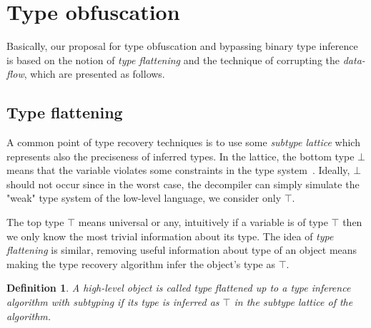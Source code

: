 \documentclass[compsoc,conference,a4paper,10pt,times]{IEEEtran}
\newtheorem{definition}{Definition}
\begin{document}
\section{Type obfuscation}
\noindent
Basically, our proposal for type obfuscation and bypassing binary type inference is based on the notion of
\emph{type flattening} and the technique of corrupting the \emph{data-flow}, which are presented as follows.

\subsection{Type flattening}
\noindent
A common point of type recovery techniques is to use some \emph{subtype lattice}
which represents also the preciseness of inferred types. In the lattice, the bottom type $\bot$ means
that the variable violates some constraints in the type system~\cite{lee_tie_2011}.
Ideally, $\bot$ should not occur since in the worst case, the decompiler can simply
simulate the "weak" type system of the low-level language, we consider only $\top$.

The top type $\top$ means universal or any, intuitively if a variable is of type $\top$ then we only
know the most trivial information about its type.
The idea of \emph{type flattening} is similar, removing useful information about type
of an object means making the type recovery algorithm infer the object's type as $\top$.

\begin{definition}
  A high-level object is called type flattened up to a type inference algorithm with subtyping
  if its type is inferred as $\top$ in the subtype lattice of the algorithm.
\end{definition}
\end{document}
